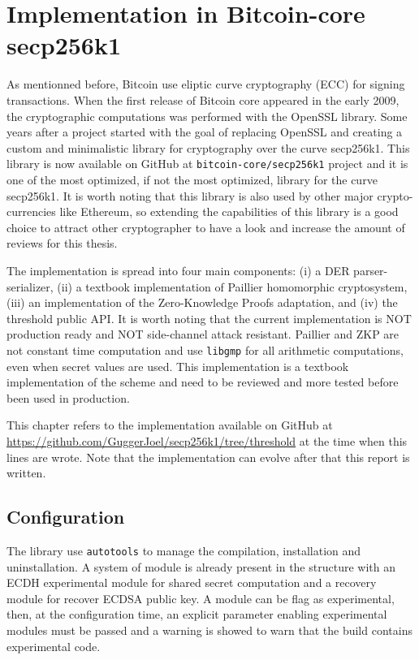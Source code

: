 \chapter{Implementation in Bitcoin-core secp256k1}
\label{chap:implementation-secp256k1}

As mentionned before, Bitcoin use eliptic curve cryptography (ECC) for signing transactions.
When the first release of Bitcoin core appeared in the early 2009, the cryptographic
computations was performed with the OpenSSL library. Some years after a project
started with the goal of replacing OpenSSL and creating a custom and minimalistic
library for cryptography over the curve secp256k1. This library is now available
on GitHub at \texttt{bitcoin-core/secp256k1} project and it is one of the most optimized,
if not the most optimized, library for the curve secp256k1. It is worth noting that
this library is also used by other major crypto-currencies like Ethereum, so extending
the capabilities of this library is a good choice to attract other cryptographer
to have a look and increase the amount of reviews for this thesis.

The implementation is spread into four main components: (i) a DER parser-serializer,
(ii) a textbook implementation of Paillier homomorphic cryptosystem, (iii) an
implementation of the Zero-Knowledge Proofs adaptation, and (iv) the threshold
public API. It is worth noting that the current implementation is NOT production
ready and NOT side-channel attack resistant. Paillier and ZKP are not constant
time computation and use \texttt{libgmp} for all arithmetic computations, even
when secret values are used. This implementation is a textbook implementation
of the scheme and need to be reviewed and more tested before been used in production.

This chapter refers to the implementation available on GitHub at
\url{https://github.com/GuggerJoel/secp256k1/tree/threshold} at the time when
this lines are wrote. Note that the implementation can evolve after that this
report is written.

\minitoc

\newpage

\section{Configuration}

The library use \texttt{autotools} to manage the compilation, installation and
uninstallation. A system of module is already present in the structure with an
ECDH experimental module for shared secret computation and a recovery module for
recover ECDSA public key. A module can be flag as experimental, then, at the
configuration time, an explicit parameter enabling experimental modules must be
passed and a warning is showed to warn that the build contains experimental code.

